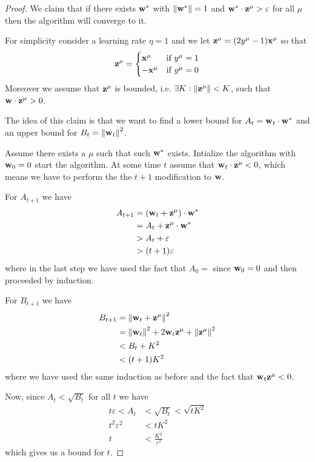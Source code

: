 \documentclass[12pt]{extarticle}
\renewcommand{\vec}[1]{\bvec{#1}}
\begin{document}
\begin{proof}
	We claim that if there exists $\vec w^*$ with $\norm{\vec w^*} = 1$ and
	$\vec w^* \cdot \vec z^\mu > \varepsilon$ for all $\mu$ then the algorithm will converge to it.

	For simplicity consider a learning rate $\eta = 1$
	and we let $\vec z^\mu = (2 y^\mu - 1) \vec x^\mu$ so that
	\begin{equation}
		\vec z^\mu = \begin{cases}
			\vec x^\mu  & \text{if }y^\mu = 1 \\
			-\vec x^\mu & \text{if }y^\mu = 0
		\end{cases}
	\end{equation}
	Moreover we assume that $\vec z^\mu$ is bounded, i.e. $\exists K : \norm{\vec z^\mu} < K$,
	such that $\vec w \cdot \vec z^\mu > 0$.

	The idea of this claim is that we want to find a lower bound for $A_t = \vec w_t \cdot \vec w^*$
	and an upper bound for $B_t = \norm{\vec w_t}^2$.

	Assume there exists a $\mu$ such that such $\vec w^*$ exists.
	Intialize the algorithm with $\vec w_0 = 0$ start the algorithm.
	At some time $t$ assume that $\vec w_t \cdot \vec z^\mu <0$, which means we have to perform the
	the $t+1$ modification to $\vec w$.

	For $A_{t+1}$ we have
	\begin{align}
		A_{t+1} & = (\vec w_t + \vec z^\mu) \cdot \vec w^* \\
		        & = A_t + \vec z^\mu \cdot \vec w^*        \\
		        & > A_t + \varepsilon                      \\
		        & > (t+1) \varepsilon                      \\
	\end{align}
	where in the last step we have used the fact that $A_0 = $ since $\vec w_0 = 0$ and then proceeded
	by induction.

	For $B_{t+1}$ we have
	\begin{align}
		B_{t+1} & = \norm{\vec w_t + \vec z^\mu}^2                                  \\
		        & = \norm{\vec w_t}^2 + 2 \vec w_t \vec z^\mu + \norm{\vec z^\mu}^2 \\
		        & < B_t + K^2                                                       \\
		        & < (t+1)K^2
	\end{align}
	where we have used the same induction as before and the fact that $\vec w_t \vec z^\mu < 0$.

	Now, since $A_t < \sqrt{B_t}$ for all $t$ we have
	\begin{align}
		t\varepsilon < A_t & < \sqrt{B_t} < \sqrt{t K^2} \\
		t^2 \varepsilon^2  & < t K^2                     \\
		t                  & < \frac{K^2}{\varepsilon^2}
	\end{align}
	which gives us a bound for $t$.
\end{proof}
\end{document}
